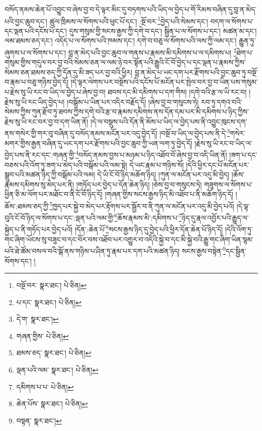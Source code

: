 བསོད་ནམས་ཆེན་པོ་འབྱུང་བ་ཞེས་བྱ་བ་དེ་ལྟར་མིང་དུ་བཏགས་པའི་ཡིད་ལ་བྱེད་པ་གོ་རིམས་བཞིན་དུ་བླ་ན་མེད་པའི་བྱང་ཆུབ་དང་། ཚུལ་ཁྲིམས་ལ་སོགས་པའི་ཕུང་པོ་དང་། :སྔོ་བར་\footnote{བསྔོ་བར་  སྣར་ཐང་།  པེ་ཅིན། }བྱེད་པའི་སེམས་དང་། བདག་ལ་སོགས་པ་དང་ལྡན་པའི་དངོས་པོ་དང་། དུས་གསུམ་གྱི་སངས་རྒྱས་ཀྱི་དགེ་བ་དང་། སྦྱིན་པ་ལ་སོགས་པ་དང་། མཚན་མ་དང་། ལམ་ཐམས་ཅད་དང་། འདོད་པ་ལ་སོགས་པའི་ཁམས་དང་། དགེ་བ་བཅུ་ལ་སོགས་པའི་ལས་ཀྱི་ལམ་དང་། རྒྱུན་ཏུ་ཞུགས་པ་ལ་སོགས་པ་དང་། བླ་ན་མེད་པའི་བྱང་ཆུབ་ལ་གནས་པ་རྣམས་མི་དམིགས་པ་ལ་དམིགས་པ། \footnote{པ་དང་  སྣར་ཐང་།  པེ་ཅིན། }ཐེག་པ་གསུམ་གྱིས་གདུལ་བར་བྱ་བའི་སེམས་ཅན་ལ་ལམ་ཉེ་བར་སྟོན་པའི་རྒྱུའི་ངོ་བོ་བྱེད་པ་དང་ལྡན་པ་རྣམས་ཀྱིས་སེམས་ཅན་ཐམས་ཅད་ཀྱི་དོན་དུ་མི་ཟད་པར་བྱ་བའི་ཕྱིར། བླ་ན་མེད་པ་ཡང་དག་པར་རྫོགས་པའི་བྱང་ཆུབ་ཏུ་བསྔོ་བ་རྣམ་པ་བཅུ་གཉིས་བྱེད་དོ། །དེ་ལྟར་ལེགས་པར་བསྔོས་པའི་དངོས་པོ་མངོན་པར་སྤེལ་བར་བྱ་བ་ཡིན་པས་གསུམ་པ་རྗེས་སུ་ཡི་རང་བ་ཡིད་ལ་བྱེད་པ་ཞེས་བྱ་བ། ཐབས་དང་མི་དམིགས་པ་དག་གིས། །དགེ་བའི་རྩ་ལ་ཡི་རང་བ། །རྗེས་སུ་ཡི་རང་ཡིད་བྱེད་པ། །བསྒོམ་པ་ཡིན་པར་འདིར་བརྗོད་དོ། །ཞེས་བྱ་བ་གསུངས་ཏེ། རབ་ཏུ་དགའ་བའི་སེམས་ཀྱིས་ཀུན་རྫོབ་ཏུ་ཐབས་ཀྱིས་དགེ་བའི་རྩ་བ་རྣམས་དམིགས་ནས་དོན་དམ་པར་མི་དམིགས་པ་ཉིད་ཀྱིས་རྗེས་སུ་ཡི་རང་བར་བྱ་བ་དག་ཡིན་ནོ། །དེ་ལ་བསྡུས་པའི་དོན་ནི་མོས་པ་ཡིད་ལ་བྱེད་པས་ནི་འབྱུང་ཁུངས་དག་ནས་གསེར་གྱི་གར་བུ་བཞིན་དུ་བསོད་ནམས་མངོན་པར་འདུ་བྱེད་དོ། །བསྔོ་བ་ཡིད་ལ་བྱེད་པས་ནི་དེ་\footnote{དེ་ག་  སྣར་ཐང་། }གསེར་མགར་གྱིས་རྒྱན་བཞིན་དུ་ཡང་དག་པར་རྫོགས་པའི་བྱང་ཆུབ་ཀྱི་ཡན་ལག་ཏུ་བྱེད་དོ། །རྗེས་སུ་ཡི་རང་བ་ཡིད་ལ་བྱེད་པས་ནི་རང་དང་:གཞན་གྱི་\footnote{གཞན་གྱིས་  པེ་ཅིན། }བསོད་ནམས་བྱས་པ་མཉམ་པ་ཉིད་འཐོབ་བོ་ཞེས་བྱ་བ་འདི་ཡིན་ནོ། །ཟག་པ་དང་བཅས་པའི་འོག་ཏུ་ཟག་པ་མེད་པའི་བསྒོམ་པའི་ལམ་སྟེ། དེ་ཡང་རྣམ་པ་གཉིས་སོ། །དེའི་ཕྱིར་དང་པོ་མངོན་པར་སྒྲུབ་པའི་མཚན་ཉིད་ཀྱི་བསྒོམ་པའི་ལམ། དེ་ཡི་ངོ་བོ་ཉིད་མཆོག་ཉིད། །ཀུན་ལ་མངོན་པར་འདུ་མི་བྱེད། །ཆོས་རྣམས་དམིགས་སུ་མེད་པར་ནི། །གཏོད་པར་བྱེད་པ་དོན་ཆེན་ཉིད། །ཅེས་བྱ་བ་གསུངས་ཏེ། གཟུགས་ལ་སོགས་པ་ཕྱིན་ཅི་མ་ལོག་པར་མཐོང་བ་ནི་ངོ་བོ་ཉིད་དོ། །གཞན་གྱིས་སངས་རྒྱས་ཉིད་མི་འཐོབ་པ་ནི་མཆོག་ཉིད་དོ། །ཆོས་:ཐམས་ཅད་ཀྱི་\footnote{ཐམས་ཅད་  སྣར་ཐང་།  པེ་ཅིན། }ཁྱད་པར་སྐྱེ་བ་མེད་པར་རྟོགས་པར་སྦྱོར་བ་ནི་ཀུན་ལ་མངོན་པར་འདུ་མི་བྱེད་པའོ། །དེ་ལྟ་བུའི་ངོ་བོ་ཉིད་ལ་སོགས་པ་དང་:ལྡན་པའི་ལམ་གྱི་\footnote{ལྡན་པའི་ལམ་  སྣར་ཐང་།  པེ་ཅིན། }ཆོས་རྣམས་མི་:དམིགས་པ་\footnote{དམིགས་པ་པ་  པེ་ཅིན། }ཉིད་དུ་རྣལ་འབྱོར་པའི་རྒྱུད་ལ་སྐྱེད་པ་ནི་གཏོད་པར་བྱེད་པའོ། །དོན་:ཆེན་པོ་\footnote{ཆེན་པོས་  སྣར་ཐང་།  པེ་ཅིན། }སངས་རྒྱས་ཉིད་དུ་བྱེད་པའི་ཕྱིར་དོན་ཆེན་པོ་ཉིད་དོ། །དེའི་འོག་ཏུ་གང་ཞིག་ཡོངས་སུ་བཟུང་བ་དང་བོར་བས་འཐོབ་པར་འགྱུར་བ་འདིའི་སྐྱེ་བ་དང་མི་སྐྱེ་བའི་རྒྱུ་གང་ཞིག་ཡིན་སྙམ་པའི་ཐེ་ཚོམ་བསལ་བའི་སྒོ་ནས་གཉིས་པ་ཤིན་ཏུ་རྣམ་པར་དག་པའི་མཚན་ཉིད། སངས་རྒྱས་བསྟེན་\footnote{བསྟན་  སྣར་ཐང་། }དང་སྦྱིན་སོགས་དང་། །
